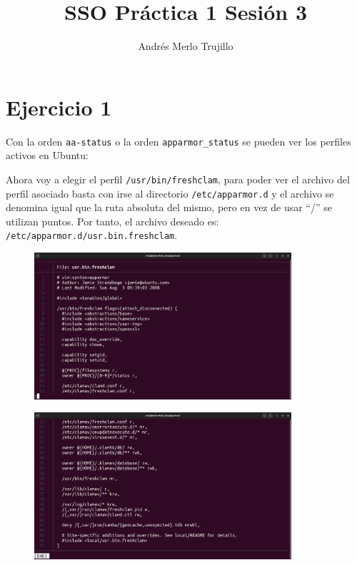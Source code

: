 \documentclass{article}
\title{SSO Práctica 1 Sesión 3}
\author{Andrés Merlo Trujillo}
\date{}
\begin{document}
\maketitle

%

\section*{Ejercicio 1}
Con la orden \verb|aa-status| o la orden \verb|apparmor_status| se pueden ver los perfiles activos en Ubuntu:


Ahora voy a elegir el perfil \verb|/usr/bin/freshclam|, para poder ver el archivo del perfil asociado basta con irse al directorio \verb|/etc/apparmor.d| y el archivo se denomina igual que la ruta absoluta del mismo, pero en vez de usar ``/'' se utilizan puntos. Por tanto, el archivo deseado es: \verb|/etc/apparmor.d/usr.bin.freshclam|.

\begin{figure}[H]
    \centering
    \includegraphics[width=0.85\textwidth]{imagenes/Captura desde 2022-10-18 16-13-59.png}
\end{figure}

\begin{figure}[H]
    \centering
    \includegraphics[width=0.85\textwidth]{imagenes/Captura desde 2022-10-18 16-14-08.png}
\end{figure}
\end{document}
